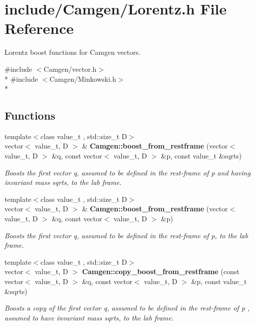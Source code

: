 \hypertarget{a00683}{}\section{include/\+Camgen/\+Lorentz.h File Reference}
\label{a00683}


Lorentz boost functions for Camgen vectors.  


{\ttfamily \#include $<$Camgen/vector.\+h$>$}\\*
{\ttfamily \#include $<$Camgen/\+Minkowski.\+h$>$}\\*
\subsection*{Functions}
\begin{DoxyCompactItemize}
\item 
{\footnotesize template$<$class value\+\_\+t , std\+::size\+\_\+t D$>$ }\\vector$<$ value\+\_\+t, D $>$ \& {\bfseries Camgen\+::boost\+\_\+from\+\_\+restframe} (vector$<$ value\+\_\+t, D $>$ \&q, const vector$<$ value\+\_\+t, D $>$ \&p, const value\+\_\+t \&sqrts)
\begin{DoxyCompactList}\small\item\em Boosts the first vector q, assumed to be defined in the rest-\/frame of p and having invariant mass sqrts, to the lab frame. \end{DoxyCompactList}\item 
{\footnotesize template$<$class value\+\_\+t , std\+::size\+\_\+t D$>$ }\\vector$<$ value\+\_\+t, D $>$ \& {\bfseries Camgen\+::boost\+\_\+from\+\_\+restframe} (vector$<$ value\+\_\+t, D $>$ \&q, const vector$<$ value\+\_\+t, D $>$ \&p)
\begin{DoxyCompactList}\small\item\em Boosts the first vector q, assumed to be defined in the rest-\/frame of p, to the lab frame. \end{DoxyCompactList}\item 
{\footnotesize template$<$class value\+\_\+t , std\+::size\+\_\+t D$>$ }\\vector$<$ value\+\_\+t, D $>$ {\bfseries Camgen\+::copy\+\_\+boost\+\_\+from\+\_\+restframe} (const vector$<$ value\+\_\+t, D $>$ \&q, const vector$<$ value\+\_\+t, D $>$ \&p, const value\+\_\+t \&sqrts)
\begin{DoxyCompactList}\small\item\em Boosts a copy of the first vector q, assumed to be defined in the rest-\/frame of p , assumed to have invariant mass sqrts, to the lab frame. \end{DoxyCompactList}\item 

\end{DoxyCompactItemize}
